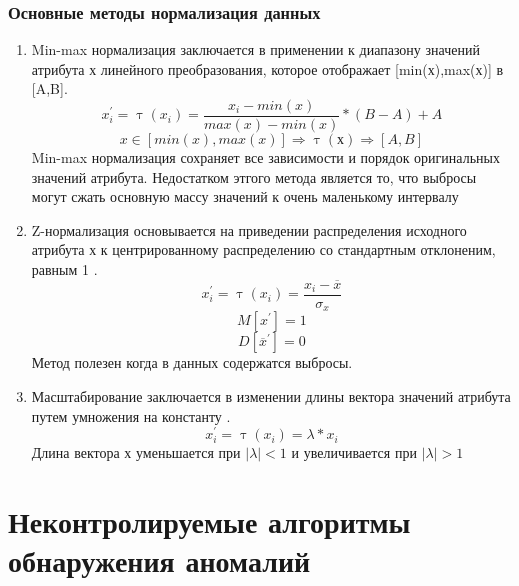 \subsubsection{Основные методы нормализация данных}
\begin{enumerate}
	\item Min-max нормализация заключается в применении к диапазону значений атрибута х линейного преобразования, которое отображает [min(х),max(х)] в [A,B].
	\begin{equation}
	x^\prime_i=\uptau(x_i)=\frac{x_i - min(x)}{max(x) - min(x)}*(B-A) + A
		\end{equation}
   \begin{equation}
		x \in[min(x), max(x)] \Rightarrow \uptau(х) \Rightarrow [A,B]
	\end{equation}
	Min-max нормализация сохраняет все зависимости и порядок оригинальных значений атрибута. Недостатком этгого метода является то, что выбросы могут сжать основную массу значений к очень маленькому интервалу
	\item Z-нормализация  основывается на приведении распределения исходного атрибута х  к центрированному распределению со стандартным отклоненим, равным 1 \cite{Book06} .
	\begin{equation}
	x^\prime_i=\uptau(x_i) =\frac{x_i - \overline{x}}{\sigma_x}
		\end{equation}
		\begin{equation}
		M[x^\prime]=1	 
		\end{equation}
		\begin{equation}
		D[\overline{x}^\prime]=0	 
		\end{equation}
		Метод полезен когда в данных содержатся выбросы.
	\item Масштабирование заключается в изменении длины вектора значений атрибута путем умножения на константу \cite{Book06} .
	\begin{equation}
	x^\prime_i=\uptau(x_i)=\lambda*x_i
	\end{equation}
	Длина вектора х уменьшается при $|\lambda|<1$ и увеличивается при $|\lambda|>1$ 
\end{enumerate}
\section{Неконтролируемые алгоритмы обнаружения аномалий}

